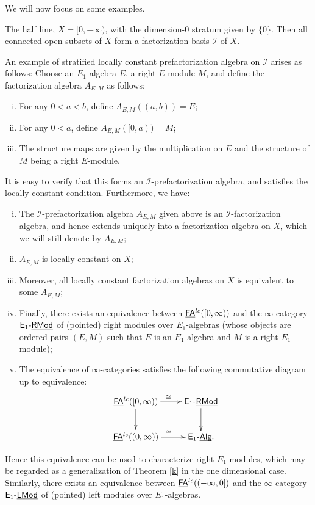 \documentclass[twoside]{article}
\begin{document}
We will now focus on some examples.

\begin{example}\label{n}
    The half line, $X=[0,+\infty)$, with the dimension-$0$ stratum given by $\{0\}$.
    Then all connected open subsets of $X$ form a factorization basis $\mathscr I$
    of $X$.

    An example of stratified locally constant prefactorization algebra
    on $\mathscr I$ arises as follows: Choose an $E_1$-algebra $E$, a right
    $E$-module $M$, and define the factorization algebra $A_{E,M}$ as follows:
    \begin{enumerate}[i)]
        \item For any $0<a<b$, define $A_{E,M}((a,b))=E$;
        \item For any $0<a$, define $A_{E,M}([0,a))=M$;
        \item The structure maps are given by the multiplication on $E$ and
        the structure of $M$ being a right $E$-module.
    \end{enumerate}

    It is easy to verify that this forms an $\mathscr I$-prefactorization algebra,
    and satisfies the locally constant condition. Furthermore, we have:

    \begin{proposition}
        \begin{enumerate}[i)]
            \item The $\mathscr I$-prefactorization algebra $A_{E,M}$ given above is an 
            $\mathscr I$-factorization algebra, and hence extends uniquely into a factorization
            algebra on $X$, which we will still denote by $A_{E,M}$;
            \item $A_{E,M}$ is locally constant on $X$;
            \item Moreover, all locally constant factorization algebras on $X$ is equivalent
            to some $A_{E,M}$;
            \item Finally, there exists an equivalence between $\underline{\smash{\mathsf{FA}}}^{lc}([0,\infty))$
            and the $\infty$-category $\mathsf{E}_1\text{-}\underline{\smash{\mathsf{RMod}}}$ of (pointed) right modules over 
            $E_1$-algebras (whose objects are ordered pairs $(E,M)$ such that $E$ is an
            $E_1$-algebra and $M$ is a right $E_1$-module);
            \item The equivalence of $\infty$-categories satisfies the following commutative
            diagram up to equivalence: $$\xymatrix{\FA^{lc}([0,\infty))\ar[r]^{\cong}\ar[d]&\E_1\-\RMod
            \ar[d]\\\FA^{lc}((0,\infty))\ar[r]^{\cong}&\E_1\-\Alg.}$$
        \end{enumerate}
    \end{proposition}

    Hence this equivalence can be used to characterize right $E_1$-modules,
    which may be regarded as a generalization of Theorem \ref{k} in the
    one dimensional case. Similarly, there exists an equivalence between
    $\underline{\smash{\mathsf{FA}}}^{lc}((-\infty,0])$ and the $\infty$-category $\mathsf{E}_1\text{-}\underline{\smash{\mathsf{LMod}}}$ of
    (pointed) left modules over $E_1$-algebras.
\end{example}
\end{document}
